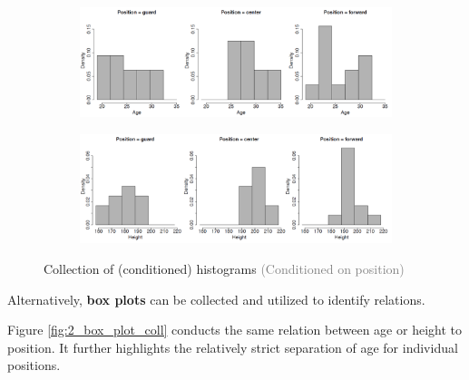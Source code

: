 \begin{figure}[H]
  \centering
  \begin{subfigure}{0.8\textwidth}
    \centering
    \includegraphics[width=\textwidth]{assets/visualization_and_extraction/feature_relation/histo_no.png}
  \end{subfigure}
  
  \vspace*{0.2cm}

  \begin{subfigure}{0.8\textwidth}
    \centering
    \includegraphics[width=\textwidth]{assets/visualization_and_extraction/feature_relation/histo_strong.png}
  \end{subfigure}
  \caption{Collection of (conditioned) histograms \textcolor{gray}{\footnotesize (Conditioned on position)}}
  \label{fig:2_histoplot}
\end{figure}

Alternatively, \textbf{box plots} can be collected and utilized to identify relations. \begin{note}Figure \ref{fig:2_box_plot_coll} conducts the same relation between age or height to position. It further highlights the relatively strict separation of age for individual positions.\end{note}

